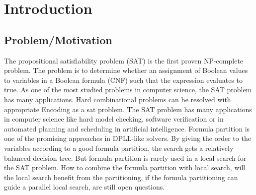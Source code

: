 \documentclass[12pt,a4paper,twoside]{scrartcl}
\numberwithin{equation}{section}
\begin{document}
\vfill\vfill\vfill
\clearpage


\pagestyle{plain}
  
\renewcommand\sectionmark[1]{\markboth{\thesection\quad\MakeUppercase{#1}}{\thesection\quad\MakeUppercase{#1}}}
\renewcommand\subsectionmark[1]{\markright{\thesubsection\quad\MakeUppercase{#1}}}


\tableofcontents
\afterpage{\null\newpage}
\clearpage

\pagestyle{normal}

\section{Introduction} 
\subsection{Problem/Motivation} 
The propositional satisfiability problem (SAT) is the first proven NP-complete problem. The problem is to determine whether an assignment of Boolean values to variables in a  Boolean formula (CNF) such that the expression evaluates to true. 
As one of the most studied problems in computer science, the SAT problem has many applications. Hard combinational problems can be resolved with appropriate Encoding as a sat problem.
The SAT problem has many applications in computer science like hard model checking, software verification or in automated planning and scheduling in artificial intelligence. 
Formula partition is one of the promising approaches in DPLL-like solvers. By giving the order to the variables according to a good formula partition, the search gets a relatively balanced decision tree. But formula partition is rarely used in a local search for the SAT problem. How to combine the formula partition with local search, will the local search benefit from the partitioning, if the formula partitioning can guide a parallel local search, are still open questions. 
\end{document}
